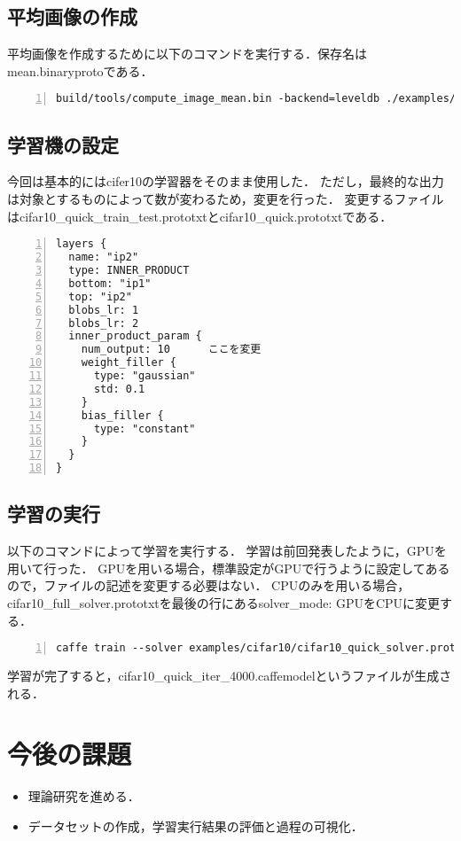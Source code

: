 \documentclass[a4paper,10pt]{jsarticle}
\begin{document}
\subsection{平均画像の作成}
平均画像を作成するために以下のコマンドを実行する．保存名はmean.binaryprotoである．
\begin{lstlisting}[basicstyle=\ttfamily\footnotesize, frame=single, firstnumber=1, numbers=left, breaklines=true]
build/tools/compute_image_mean.bin -backend=leveldb ./examples/cifar10/cifar10_train_leveldb ./examples/cifar10/mean.binaryproto
\end{lstlisting}

\subsection{学習機の設定}
今回は基本的にはcifer10の学習器をそのまま使用した．
ただし，最終的な出力は対象とするものによって数が変わるため，変更を行った．
変更するファイルはcifar10\_quick\_train\_test.prototxtとcifar10\_quick.prototxtである．

\begin{lstlisting}[basicstyle=\ttfamily\footnotesize, frame=single, firstnumber=1, numbers=left, breaklines=true]
layers {
  name: "ip2"
  type: INNER_PRODUCT
  bottom: "ip1"
  top: "ip2"
  blobs_lr: 1
  blobs_lr: 2
  inner_product_param {
    num_output: 10      ここを変更
    weight_filler {
      type: "gaussian"
      std: 0.1
    }
    bias_filler {
      type: "constant"
    }
  }
}
\end{lstlisting}

\subsection{学習の実行}
以下のコマンドによって学習を実行する．
学習は前回発表したように，GPUを用いて行った．
GPUを用いる場合，標準設定がGPUで行うように設定してあるので，ファイルの記述を変更する必要はない．
CPUのみを用いる場合，cifar10\_full\_solver.prototxtを最後の行にあるsolver\_mode: GPUをCPUに変更する．

\begin{lstlisting}[basicstyle=\ttfamily\footnotesize, frame=single, firstnumber=1, numbers=left, breaklines=true]
caffe train --solver examples/cifar10/cifar10_quick_solver.prototxt
\end{lstlisting}

学習が完了すると，cifar10\_quick\_iter\_4000.caffemodelというファイルが生成される．

\section{今後の課題}
\begin{itemize}
 \item 理論研究を進める．
 \item データセットの作成，学習実行結果の評価と過程の可視化．
\end{itemize}
\end{document}
